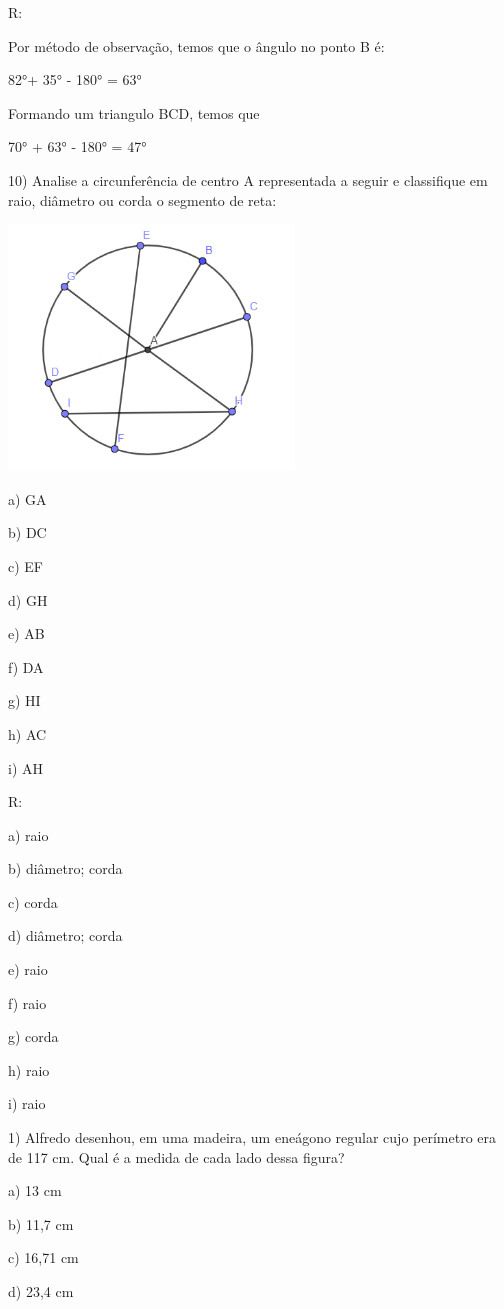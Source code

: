R:

Por método de observação, temos que o ângulo no ponto B é:

82°+ 35° - 180° = 63°

Formando um triangulo BCD, temos que

70° + 63° - 180° = 47°

10) Analise a circunferência de centro A representada a seguir e
classifique em raio, diâmetro ou corda o segmento de reta:

\includegraphics[width=2.98681in,height=2.57292in]{./imgSAEB_8_MAT/media/image12.png}

a) GA

b) DC

c) EF

d) GH

e) AB

f) DA

g) HI

h) AC

i) AH

R:

a) raio

b) diâmetro; corda

c) corda

d) diâmetro; corda

e) raio

f) raio

g) corda

h) raio

i) raio


1) Alfredo desenhou, em uma madeira, um eneágono regular cujo perímetro
era de 117 cm. Qual é a medida de cada lado dessa figura?

a) 13 cm

b) 11,7 cm

c) 16,71 cm

d) 23,4 cm


